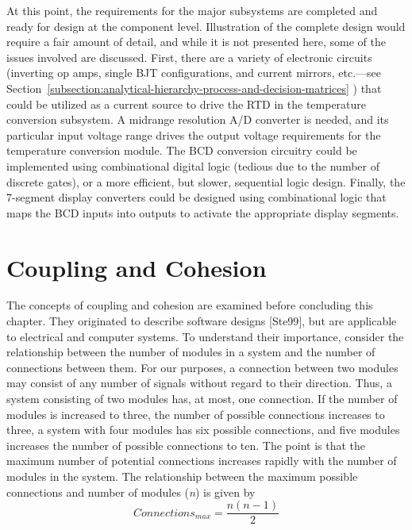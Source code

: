 At this point, the requirements for the major subsystems are completed
and ready for design at the component level. Illustration of the
complete design would require a fair amount of detail, and while it is
not presented here, some of the issues involved are discussed. First,
there are a variety of electronic circuits (inverting op amps, single
BJT configurations, and current mirrors, etc.---see 
Section~\ref{subsection:analytical-hierarchy-process-and-decision-matrices} ) 
that could be utilized as a current source to drive the RTD
in the temperature conversion subsystem. A midrange resolution A/D
converter is needed, and its particular input voltage range drives the
output voltage requirements for the temperature conversion module. The
BCD conversion circuitry could be implemented using combinational
digital logic (tedious due to the number of discrete gates), or a more
efficient, but slower, sequential logic design. Finally, the 7-segment
display converters could be designed using combinational logic that maps
the BCD inputs into outputs to activate the appropriate display
segments.

\section{Coupling and Cohesion}
\label{section:coupling-and-cohesion}

The concepts of coupling and cohesion are examined before concluding
this chapter. They originated to describe software designs {[}Ste99{]},
but are applicable to electrical and computer systems. To understand
their importance, consider the relationship between the number of
modules in a system and the number of connections between them. For our
purposes, a connection between two modules may consist of any number of
signals without regard to their direction. Thus, a system consisting of
two modules has, at most, one connection. If the number of modules is
increased to three, the number of possible connections increases to
three, a system with four modules has six possible connections, and five
modules increases the number of possible connections to ten. The point
is that the maximum number of potential connections increases rapidly
with the number of modules in the system. The relationship between the
maximum possible connections and number of modules (\emph{n}) is given
by
$$Connections_{max} = \frac{n(n-1)}{2}$$

